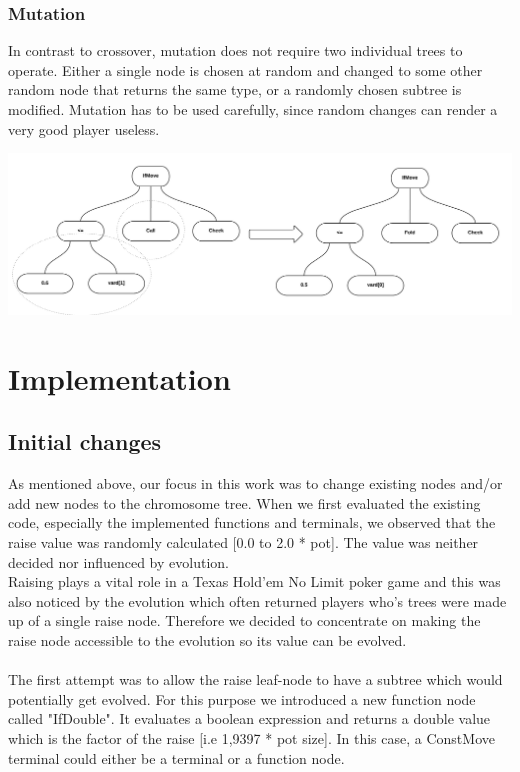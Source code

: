 \documentclass[12pt,fleqn,a4paper]{article}
\begin{document}
\subsubsection{Mutation}
In contrast to crossover, mutation does not require two individual trees to operate.
Either a single node is chosen at random and changed to some other random node that returns the same type,
or a randomly chosen subtree is modified.
Mutation has to be used carefully, since random changes can render a very good player useless.

\begin{center}
	\includegraphics[width=1.0\textwidth]{tree_mutation.png}
\end{center}

\newpage
\section{Implementation}
\subsection{Initial changes}
As mentioned above, our focus in this work was to change existing nodes and/or add
new nodes to the chromosome tree. When we first evaluated the existing code, especially the implemented functions and terminals, we observed that the raise value was randomly calculated [0.0 to 2.0 * pot]. The value was neither decided nor influenced by evolution. \\
Raising plays a vital role in a Texas Hold'em No Limit poker game and this was also noticed by the evolution which often returned players who's trees were made up of a single raise node.
Therefore we decided to concentrate on making the raise node accessible to the evolution so its value can be evolved.
\\ \\ 
The first attempt was to allow the raise leaf-node to have a subtree which would potentially get evolved. For this purpose we introduced a new function node called "IfDouble". It evaluates a boolean expression and returns a double value which is the factor of the raise [i.e 1,9397 * pot size]. In this case, a ConstMove terminal could either be a terminal or a function node.
\end{document}
